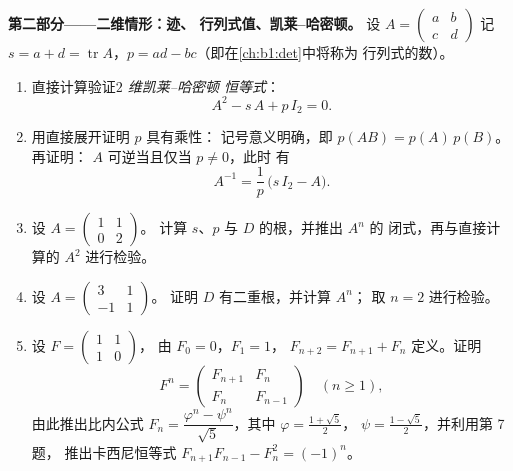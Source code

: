 \begin{problem}
\medskip
\noindent\textbf{第二部分——二维情形：迹、
行列式值、凯莱–哈密顿。} 设 $A = \begin{pmatrix} a & b\\ c &
d\end{pmatrix}$ 记 $s = a + d = \operatorname{tr} A$，$p = ad
- bc$（即在\cref{ch:b1:det}中将称为
行列式的数）。
\begin{enumerate}[resume]
  \item 直接计算验证\emph{$2$ 维凯莱–哈密顿
        恒等式}：
        \[
        A^2 - s\,A + p\,I_2 = 0 .
        \]
  \item 用直接展开证明 $p$ 具有乘性：
        记号意义明确，即 $p(AB) = p(A)\,p(B)$。再证明：
        $A$ 可逆当且仅当 $p \neq 0$，此时
        有
        \[
        A^{-1} = \frac1p\,\bigl(s\,I_2 - A\bigr).
        \]
  \item 设 $A = \begin{pmatrix} 1 & 1\\ 0 & 2\end{pmatrix}$。
        计算 $s$、$p$ 与 $D$ 的根，并推出 $A^n$ 的
        闭式，再与直接计算的
        $A^2$ 进行检验。
  \item 设 $A = \begin{pmatrix} 3 & 1\\ -1 & 1\end{pmatrix}$。
        证明 $D$ 有二重根，并计算 $A^n$；
        取 $n = 2$ 进行检验。
  \item 设 $F = \begin{pmatrix} 1 & 1\\ 1 & 0\end{pmatrix}$，
        由 $F_0 = 0$，$F_1 = 1$，
        $F_{n+2} = F_{n+1} + F_n$ 定义。证明
        \[
        F^n = \begin{pmatrix} F_{n+1} & F_n\\ F_n &
        F_{n-1}\end{pmatrix} \quad (n \geq 1),
        \]
        由此推出比内公式 $F_n = \dfrac{\varphi^n -
        \psi^n}{\sqrt5}$，其中 $\varphi = \frac{1 + \sqrt5}2$，
        $\psi = \frac{1 - \sqrt5}2$，并利用第 7 题，
        推出卡西尼恒等式 $F_{n+1}F_{n-1} - F_n^2 = (-1)^n$。
\end{enumerate}


\end{problem}
